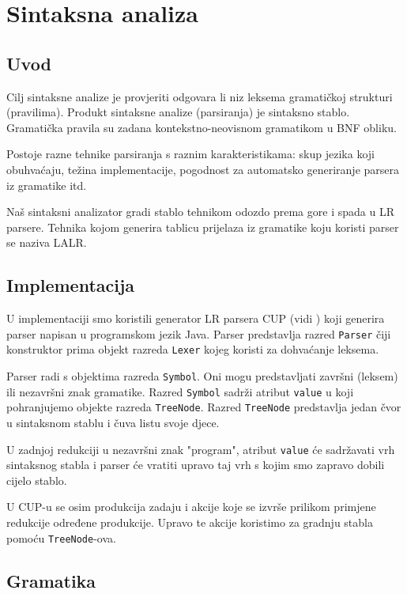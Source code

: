 \chapter{Sintaksna analiza}

\section{Uvod}
Cilj sintaksne analize je provjeriti odgovara li niz leksema gramatičkoj strukturi (pravilima). Produkt
sintaksne analize (parsiranja) je sintaksno stablo. Gramatička pravila su zadana kontekstno-neovisnom
gramatikom u BNF obliku.

Postoje razne tehnike parsiranja s raznim karakteristikama: skup jezika koji obuhvaćaju, težina
implementacije, pogodnost za automatsko generiranje parsera iz gramatike itd.

Naš sintaksni analizator gradi stablo tehnikom odozdo prema gore i spada u LR parsere. Tehnika
kojom generira tablicu prijelaza iz gramatike koju koristi parser se naziva LALR.

\section{Implementacija}

U implementaciji smo koristili generator LR parsera CUP (vidi \cite{cup}) koji generira parser napisan u programskom jezik Java.
Parser predstavlja razred \texttt{Parser} čiji konstruktor prima objekt razreda \texttt{Lexer}
kojeg koristi za dohvaćanje leksema.

Parser radi s objektima razreda \texttt{Symbol}. Oni mogu predstavljati završni (leksem) ili nezavršni znak gramatike.
Razred \texttt{Symbol} sadrži atribut \texttt{value} u koji pohranjujemo objekte razreda \texttt{TreeNode}. Razred
\texttt{TreeNode} predstavlja jedan čvor u sintaksnom stablu i čuva listu svoje djece.

U zadnjoj redukciji u nezavršni znak "program", atribut \texttt{value} će sadržavati vrh sintaksnog stabla i parser
će vratiti upravo taj vrh s kojim smo zapravo dobili cijelo stablo.

U CUP-u se osim produkcija zadaju i akcije koje se izvrše prilikom primjene redukcije određene produkcije. Upravo
te akcije koristimo za gradnju stabla pomoću \texttt{TreeNode}-ova.

\section{Gramatika}


